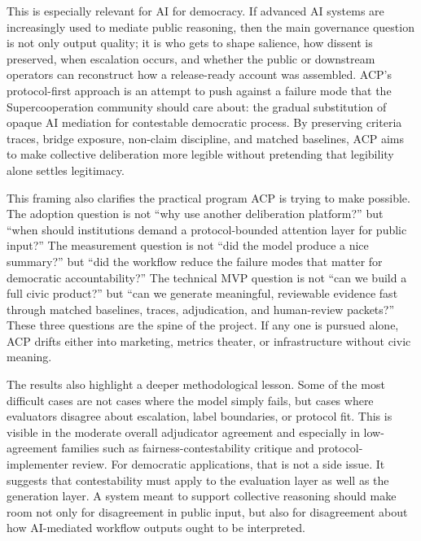 \documentclass[11pt]{article}
\begin{document}
\vspace{0.1in}
This is especially relevant for AI for democracy. If advanced AI systems are increasingly used to mediate public reasoning, then the main governance question is not only output quality; it is who gets to shape salience, how dissent is preserved, when escalation occurs, and whether the public or downstream operators can reconstruct how a release-ready account was assembled. ACP's protocol-first approach is an attempt to push against a failure mode that the Supercooperation community should care about: the gradual substitution of opaque AI mediation for contestable democratic process. By preserving criteria traces, bridge exposure, non-claim discipline, and matched baselines, ACP aims to make collective deliberation more legible without pretending that legibility alone settles legitimacy.

\vspace{0.1in}
This framing also clarifies the practical program ACP is trying to make possible. The adoption question is not ``why use another deliberation platform?'' but ``when should institutions demand a protocol-bounded attention layer for public input?'' The measurement question is not ``did the model produce a nice summary?'' but ``did the workflow reduce the failure modes that matter for democratic accountability?'' The technical MVP question is not ``can we build a full civic product?'' but ``can we generate meaningful, reviewable evidence fast through matched baselines, traces, adjudication, and human-review packets?'' These three questions are the spine of the project. If any one is pursued alone, ACP drifts either into marketing, metrics theater, or infrastructure without civic meaning.

\vspace{0.1in}
The results also highlight a deeper methodological lesson. Some of the most difficult cases are not cases where the model simply fails, but cases where evaluators disagree about escalation, label boundaries, or protocol fit. This is visible in the moderate overall adjudicator agreement and especially in low-agreement families such as fairness-contestability critique and protocol-implementer review. For democratic applications, that is not a side issue. It suggests that contestability must apply to the evaluation layer as well as the generation layer. A system meant to support collective reasoning should make room not only for disagreement in public input, but also for disagreement about how AI-mediated workflow outputs ought to be interpreted.
\end{document}
